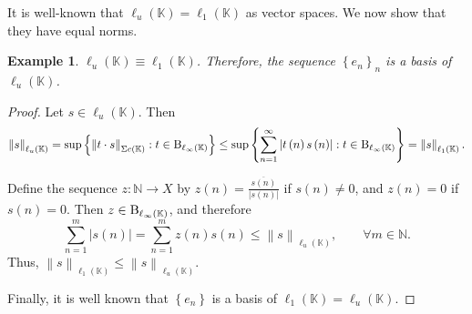\documentclass[14pt, a4paper]{article}  %
\providecommand{\llave}[1]{\left\lbrace #1\right\rbrace }
\providecommand{\pare}[1]{\left( #1\right) }
\providecommand{\norm}[1]{\left\lVert#1\right\rVert}
\providecommand{\abs}[1]{\left\lvert#1\right\rvert}
\newcommand{\tien}{\rightarrow}
\newcommand{\K}{\mathbb{K}}
\newcommand{\N}{\mathbb{N}}
\newcommand{\B}{\textup{B}}
\newtheorem{example}{Example}[section]  %
\begin{document}
	 It is well-known that   $\ell_{u}\pare{\K}=\ell_{1}\pare{\K}$ as vector spaces. We now show that they have equal norms.
\begin{example}\label{d316_2}
	$\ell_{u}\pare{\K}\equiv \ell_{1}\pare{\K}$. Therefore, the sequence $\llave{e_{n}}_{n}$ is a basis of $\ell_{u}\pare{\K}$.
\end{example}
\begin{proof}
	Let $s\in \ell_{u}\pare{\K}$. Then 
	\begin{equation}
		\norm{s}_{\ell_{u}\pare{\K}} = \sup\llave{\norm{t\cdot s}_{\Sigma c\pare{\K}}: t \in \B_{\ell_{\infty}\pare{\K}}} 
		\leq \sup\llave{\sum_{n=1}^{\infty}\abs{t\pare{n}s\pare{n}}: t \in \B_{\ell_{\infty}\pare{\K}}} = \norm{s}_{\ell_{1}\pare{\K}}.
	\end{equation}
	
	
	Define the sequence $z: \N \tien X$ by $z\pare{n} = \frac{\overline{s\pare{n}}}{\abs{s\pare{n}}}$ if $s\pare{n} \neq 0$, and $z\pare{n} = 0$ if $s\pare{n} = 0$. Then $z \in \B_{\ell_{\infty}\pare{\K}}$, and therefore 
	\begin{equation}
		\sum_{n=1}^{m}\abs{s\pare{n}} = \sum_{n=1}^{m}z\pare{n}s\pare{n} \leq \norm{s}_{\ell_{u}\pare{\K}}, \qquad \forall m \in \N.
	\end{equation}
	Thus, $\norm{s}_{\ell_{1}\pare{\K}} \leq \norm{s}_{\ell_{u}\pare{\K}}$. 
	
	Finally, it is well known that $\llave{e_{n}}$ is a basis of $\ell_{1}\pare{\K} = \ell_{u}\pare{\K}$.
\end{proof}

		
	
\end{document}
